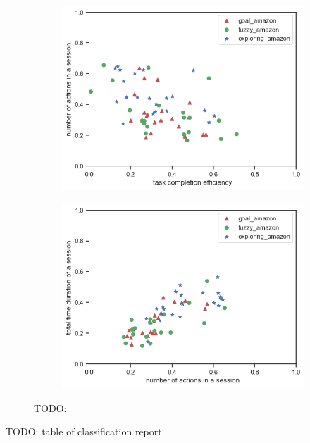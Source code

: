 \begin{figure}[H]
\begin{subfigure}[b]{0.45\textwidth}
        \includegraphics[width=1\textwidth]{figures/2d-eff-len-amazon}
        \caption{}
        \label{fig:2d-eff-len-amazon}
    \end{subfigure}
    \begin{subfigure}[b]{0.45\textwidth}
        \includegraphics[width=1\textwidth]{figures/2d-len-dur-amazon}
        \caption{}
        \label{fig:2d-len-dur-amazon}
    \end{subfigure}

    \caption{TODO:}
    \label{fig:general-amazon}
\end{figure}

TODO: table of classification report

